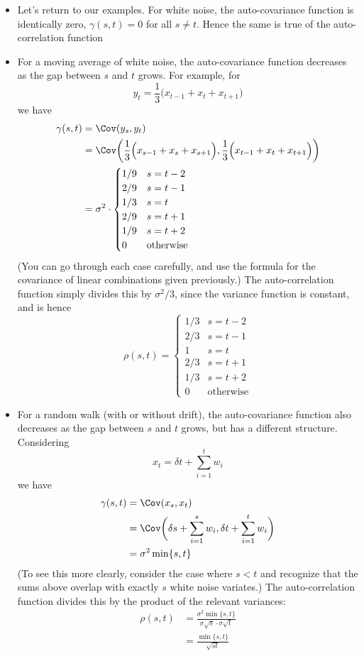 \documentclass{article}
\begin{document}
\begin{itemize}
\item Let's return to our examples. For white noise, the auto-covariance
  function is identically zero, $\gamma(s,t) = 0$ for all $s \not= t$. Hence the
  same is true of the auto-correlation function

\item For a moving average of white noise, the auto-covariance function
  decreases as the gap between $s$ and $t$ grows. For example, for  
  \[
  y_t = \frac{1}{3} \Big( x_{t-1} + x_t + x_{t+1} \Big)
  \]
  we have
  \begin{align*}
  \gamma(s,t) &= \Cov(y_s, y_t) \\
  &= \Cov \bigg( \frac{1}{3} \Big( x_{s-1} + x_s + x_{s+1} \Big), 
    \frac{1}{3} \Big( x_{t-1} + x_t + x_{t+1} \Big) \bigg) \\
  &=  \sigma^2 \cdot 
  \begin{cases}
  1 / 9 & s = t-2 \\
  2 / 9 & s = t-1 \\
  1 / 3 & s = t \\
  2 / 9 & s = t+1 \\
  1 / 9 & s = t+2 \\
  0 & \text{otherwise}
  \end{cases}
  \end{align*}
  (You can go through each case carefully, and use the formula for the
  covariance of linear combinations given previously.) The auto-correlation
  function simply divides this by $\sigma^2 / 3$, since the variance function is 
  constant, and is hence
  \[
  \rho(s,t) = 
  \begin{cases}
  1 / 3 & s = t-2 \\
  2 / 3 & s = t-1 \\
  1 & s = t \\
  2 / 3 & s = t+1 \\
  1 / 3 & s = t+2 \\
  0 & \text{otherwise}
  \end{cases}
  \]

\item For a random walk (with or without drift), the auto-covariance function
  also decreases as the gap between $s$ and $t$ grows, but has a different 
  structure. Considering 
  \[
  x_t = \delta t + \sum_{i=1}^t w_i
  \]
  we have
  \begin{align*}
  \gamma(s,t) &= \Cov(x_s, x_t) \\
  &= \Cov \bigg( \delta s + \sum_{i=1}^s w_i, \delta t + \sum_{i=1}^t w_i \bigg)
    \\  
  &= \sigma^2 \min\{s, t\}
  \end{align*}
  (To see this more clearly, consider the case where $s<t$ and recognize that 
  the sums above overlap with exactly $s$ white noise variates.) The
  auto-correlation function divides this by the product of the relevant
  variances: 
  \begin{align*}
  \rho(s,t) &= \frac{\sigma^2 \min\{s, t\}}{\sigma \sqrt{s} \cdot \sigma 
              \sqrt{t}} \\  
  &= \frac{\min\{s, t\}}{\sqrt{st}}
  \end{align*}


\end{itemize}
\end{document}
